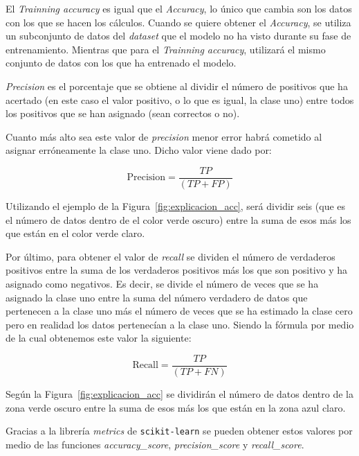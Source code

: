 \documentclass[a4paper, 12pt]{book}
\begin{document}
El \textit{Trainning accuracy} es igual que el \textit{Accuracy}, lo único que cambia son los datos con los que se hacen los cálculos. Cuando se quiere obtener el \textit{Accuracy}, se utiliza un subconjunto de datos del \textit{dataset} que el modelo no ha visto durante su fase de entrenamiento. Mientras que para el \textit{Trainning accuracy}, utilizará el mismo conjunto de datos con los que ha entrenado el modelo.

\textit{Precision} es el porcentaje que se obtiene al dividir el número de positivos que ha acertado (en este caso el valor positivo, o lo que es igual, la clase uno) entre todos los positivos que se han asignado (sean correctos o no). 

Cuanto más alto sea este valor de \textit{precision} menor error habrá cometido al asignar erróneamente la clase uno. Dicho valor viene dado por:

\begin{equation}
\label{eqn:accuracy} 
 \boxed{\mbox{Precision} = \frac{TP}{(TP + FP)}}
\end{equation}

Utilizando el ejemplo de la Figura~\ref{fig:explicacion_acc}, será dividir seis (que es el número de datos dentro de el color verde oscuro) entre la suma de esos más los que están en el color verde claro.

Por último, para obtener el valor de \textit{recall} se dividen el número de verdaderos positivos entre la suma de los verdaderos positivos más los que son positivo y ha asignado como negativos. Es decir, se divide el número de veces que se ha asignado la clase uno entre la suma del número verdadero de datos que pertenecen a la clase uno más el número de veces que se ha estimado la clase cero pero en realidad los datos pertenecían a la clase uno. Siendo la fórmula por medio de la cual obtenemos este valor la siguiente:

\begin{equation}
 \boxed{\mbox{Recall} = \frac{TP}{(TP + FN)}}
\end{equation}

Según la Figura~\ref{fig:explicacion_acc} se dividirán el número de datos dentro de la zona verde oscuro entre la suma de esos más los que están en la zona azul claro.

Gracias a la librería \textit{metrics} de \texttt{scikit-learn} se pueden obtener estos valores por medio de las funciones \textit{accuracy\_score}, \textit{precision\_score} y \textit{recall\_score}. 
\end{document}
